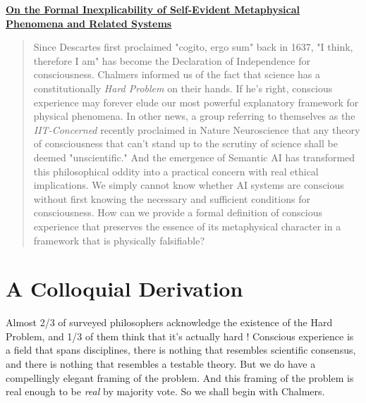 \documentclass[runningheads]{llncs}
\begin{document}
\begin{center}
    {\Large\bfseries\boldmath
        \href{https://dna-platform.github.io/inexplicable-phenomena/articles/inexplicable-phenomena/inexplicable-phenomena.html}{On the Formal Inexplicability of Self-Evident Metaphysical Phenomena and Related Systems}
        \par}
    \vskip 0.8cm
\end{center}

\begin{abstract}
Since Descartes first proclaimed "cogito, ergo sum" back in 1637, "I think, therefore I am" has become the Declaration of Independence for consciousness. Chalmers informed us of the fact that science has a constitutionally \emph{Hard Problem} on their hands. If he's right, conscious experience may forever elude our most powerful explanatory framework for physical phenomena. In other news, a group referring to themselves as the \emph{IIT-Concerned} recently proclaimed in Nature Neuroscience that any theory of consciousness that can't stand up to the scrutiny of science shall be deemed "unscientific." And the emergence of Semantic AI has transformed this philosophical oddity into a practical concern with real ethical implications. We simply cannot know whether AI systems are conscious without first knowing the necessary and sufficient conditions for consciousness. How can we provide a formal definition of conscious experience that preserves the essence of its metaphysical character in a framework that is physically falsifiable?

\end{abstract}

\section{A Colloquial Derivation}

Almost 2/3 of surveyed philosophers acknowledge the existence of the Hard Problem, and 1/3 of them think that it's actually hard \cite{BourgetChalmers2023}! Conscious experience is a field that spans disciplines, there is nothing that resembles scientific consensus, and there is nothing that resembles a testable theory. But we do have a compellingly elegant framing of the problem. And this framing of the problem is real enough to be \emph{real} by majority vote. So we shall begin with Chalmers.
\end{document}
